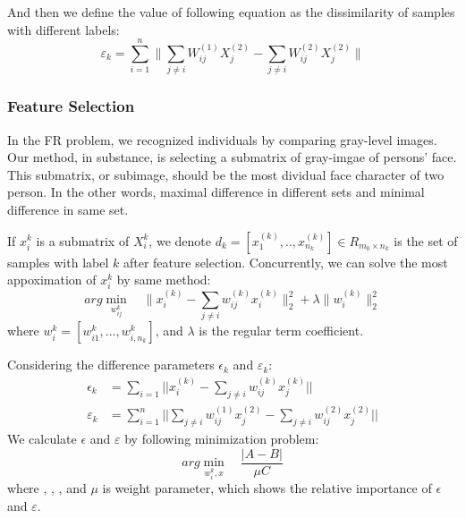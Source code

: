 \documentclass[10pt,journal,final,twocolumn,]{IEEEtran}
\begin{document}
	And then we define the value of following equation as the dissimilarity of samples with different labels:
	\begin{equation}
	\varepsilon_{k} =\sum_{i=1}^{n} \parallel \sum_{j \neq i} W_{ij}^{(1)}X_{j}^{(2)} - \sum_{j \neq i} W_{ij}^{(2)}X_{j}^{(2)} \parallel
	\end{equation} 
	
	
	
	\subsubsection{\textbf{Feature Selection}}
	In the FR problem, we recognized individuals by comparing gray-level images. Our method, in substance, is selecting a submatrix of gray-imgae of persons' face. This submatrix, or subimage, should be the most dividual face character of two person. In the other words, maximal difference in different sets and minimal difference in same set.
	
	If $x_{i}^{k}$ is a submatrix of $X_{i}^{k}$, we denote $d_{k}=[x_{1}^{(k)},..,x_{n_{k}}^{(k)}] \in R_{m_{0} \times n_{k}}$ is the set of samples with label $k$ after feature selection. Concurrently, we can solve the most appoximation of $x_{i}^{k}$ by same method:
	\begin{equation}
	arg \min_{w_{ij}^{k}} \quad \parallel x_{i}^{(k)}- \sum_{j \neq i} w_{ij}^{(k)}x_{i}^{(k)} \parallel_{2}^{2} + \lambda \parallel w_{i}^{(k)} \parallel_{2}^{2}
	\end{equation} 
	where $w_{i}^{k}=[w_{i1}^{k}, ... , w_{i,n_{k}}^{k} ]$, and $\lambda$ is the regular term coefficient.
	
	Considering the difference parameters $\epsilon_{k}$ and $\varepsilon_{k}$:
	\begin{align}
	\epsilon_{k}&=\sum_{i=1} || x_{i}^{(k)}-\sum_{j \neq i} w_{ij}^{(k)}x_{j}^{(k)}||\\
	\varepsilon_{k}&=\sum_{i=1}^{n} || \sum_{j \neq i} w_{ij}^{(1)}x_{j}^{(2)} - \sum_{j \neq i} w_{ij}^{(2)}x_{j}^{(2)} ||
	\end{align} 
	We calculate $\epsilon$ and $\varepsilon$ by following minimization problem:
	\begin{equation}
	arg\min_{w_{i}^{k},x} \quad  \frac{|A - B|}{\mu C}
	\end{equation}
	where , ,  , and $\mu$ is weight parameter, which shows the relative importance of $\epsilon$ and $\varepsilon$.
	
\end{document}
